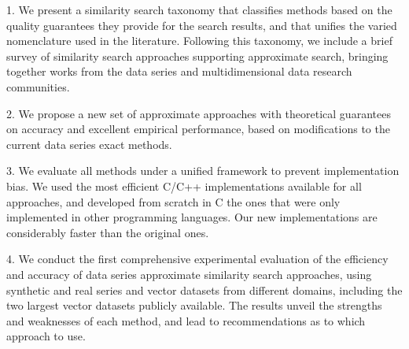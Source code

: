 1. We present a similarity search taxonomy that classifies methods based on the quality guarantees they provide for the search results, and that unifies the varied nomenclature used in the literature. %
Following this taxonomy, we include a brief survey of similarity search approaches supporting approximate search, bringing together works from the data series and multidimensional data research communities.

2. We propose a new set of approximate approaches with theoretical guarantees on accuracy and excellent empirical performance, based on modifications to the current data series exact methods.

3. We evaluate all methods under a unified framework to prevent implementation bias. We used the most efficient C/C++ implementations available for all approaches, and developed from scratch in C the ones that were only implemented in other programming languages. Our new implementations are considerably faster than the original ones.

4. We conduct the first comprehensive experimental evaluation of the efficiency and accuracy of data series approximate similarity search approaches, using synthetic and real series and vector datasets from different domains, including the two largest vector datasets publicly available.
The results unveil the strengths and weaknesses of each method, and lead to recommendations as to which approach to use. %

